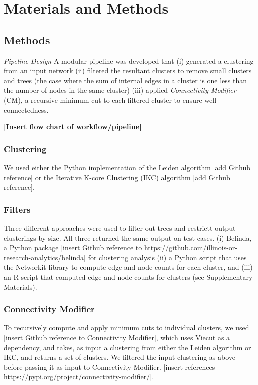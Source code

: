 \documentclass[12pt, oneside]{article}   	%
\begin{document}
\section{Materials and Methods}

\subsection{Methods} 
\emph{Pipeline Design} A modular pipeline was developed that (i) generated a clustering from an input network (ii) filtered the resultant clusters to remove small clusters and trees (the case where the sum of internal edges in a cluster is one less than the number of nodes in the same cluster) (iii) applied \emph{Connectivity Modifier} (CM), a recursive minimum cut to each filtered cluster to ensure well-connectedness.

\vspace{5 mm}
\textbf{[Insert flow chart of workflow/pipeline]}

\subsubsection{Clustering} We used either the Python implementation of the Leiden algorithm [add Github reference] or the Iterative K-core Clustering (IKC) algorithm [add Github reference].

\subsubsection{Filters} Three different approaches were used to filter out trees and restrictt output clusterings by size. All three returned the same output on test cases. (i) Belinda, a Python package [insert Github reference to https://github.com/illinois-or-research-analytics/belinda] for clustering analysis (ii) a Python script that uses the Networkit library \citep{Staudt2016} to compute edge and node counts for each cluster, and (iii) an R script that computed edge and node counts for clusters (see Supplementary Materials). 

\subsubsection{Connectivity Modifier} To recursively compute and apply minimum cuts to individual clusters, we used [insert Github reference to Connectivity Modifier], which uses Viecut \citep{Henzinger2018,Henzinger2019} as a dependency, and takes, as input a clustering from either the Leiden algorithm or IKC, and returns a set of clusters. We filtered the input clustering as above before passing it as input to Connectivity Modifier. [insert references https://pypi.org/project/connectivity-modifier/].
\end{document}
